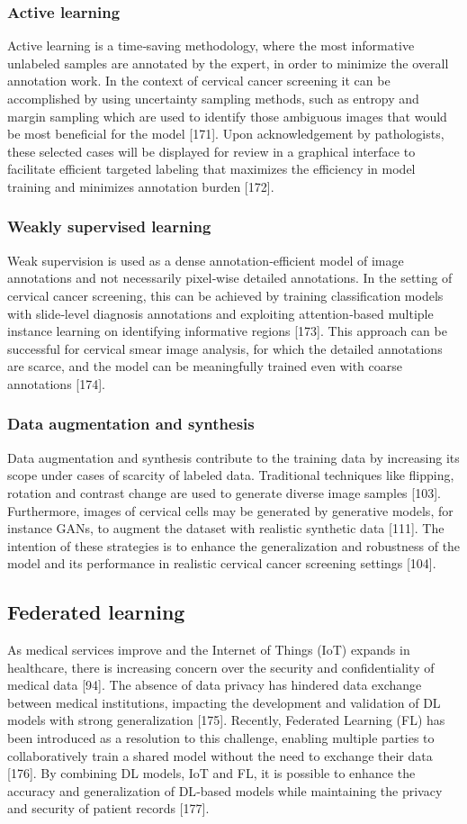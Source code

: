 \documentclass{svjour3}
\begin{document}
\subsubsection{Active learning}
Active learning is a time‑saving methodology, where the most informative unlabeled samples are annotated by the expert, in order to minimize the overall annotation work. In the context of cervical cancer screening it can be accomplished by using uncertainty sampling methods, such as entropy and margin sampling which are used to identify those ambiguous images that would be most beneficial for the model [171]. Upon acknowledgement by pathologists, these selected cases will be displayed for review in a graphical interface to facilitate efficient targeted labeling that maximizes the efficiency in model training and minimizes annotation burden [172].
\subsubsection{Weakly supervised learning}
Weak supervision is used as a dense annotation‑efficient model of image annotations and not necessarily pixel‑wise detailed annotations. In the setting of cervical cancer screening, this can be achieved by training classification models with slide‑level diagnosis annotations and exploiting attention‑based multiple instance learning on identifying informative regions [173]. This approach can be successful for cervical smear image analysis, for which the detailed annotations are scarce, and the model can be meaningfully trained even with coarse annotations [174].
\subsubsection{Data augmentation and synthesis}
Data augmentation and synthesis contribute to the training data by increasing its scope under cases of scarcity of labeled data. Traditional techniques like flipping, rotation and contrast change are used to generate diverse image samples [103]. Furthermore, images of cervical cells may be generated by generative models, for instance GANs, to augment the dataset with realistic synthetic data [111]. The intention of these strategies is to enhance the generalization and robustness of the model and its performance in realistic cervical cancer screening settings [104].
\subsection{Federated learning}
As medical services improve and the Internet of Things (IoT) expands in healthcare, there is increasing concern over the security and confidentiality of medical data [94]. The absence of data privacy has hindered data exchange between medical institutions, impacting the development and validation of DL models with strong generalization [175]. Recently, Federated Learning (FL) has been introduced as a resolution to this challenge, enabling multiple parties to collaboratively train a shared model without the need to exchange their data [176]. By combining DL models, IoT and FL, it is possible to enhance the accuracy and generalization of DL‑based models while maintaining the privacy and security of patient records [177].
\end{document}
